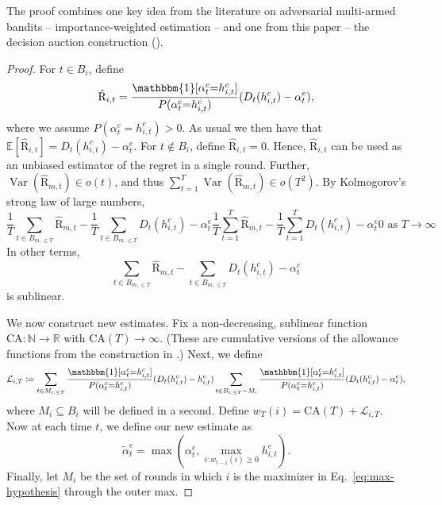 \documentclass[submission,copyright,creativecommons]{eptcs}
\DeclareMathOperator{\Var}{Var}
\begin{document}
\begin{extendedonlyblock}
The proof combines one key idea from the literature on adversarial multi-armed bandits -- importance-weighted estimation -- and one from this paper -- the decision auction construction ().

\begin{proof}
For $t\in B_i$, define
\begin{equation*}
\hat{\mathrm{R}}_{i,t} = \frac{\mathbbm{1}[\alpha_{t}^c{=}h_{i,t}^c]}{P(\alpha_{t}^c{=}h_{i,t}^c)}(D_t(h^c_{i,t}) - \alpha^e_t),
\end{equation*}
where we assume $P(\alpha_{t}^c{=}h_{i,t}^c)>0$.
As usual we then have that $\mathbb{E}\left[ \hat{\mathrm{R}}_{i,t} \right] = D_t(h^c_{i,t}) - \alpha^e_t$.
For $t\notin B_i$, define $\hat{\mathrm{R}}_{i,t}=0$.
Hence, $\hat{\mathrm{R}}_{i,t}$ can be used as an unbiased estimator of the regret in a single round.
Further, $\Var(\hat{\mathrm{R}}_{m,t})\in o(t)$, and thus $\sum_{t=1}^T \Var(\hat{\mathrm{R}}_{m,t}) \in o(T^2)$. By Kolmogorov's strong law of large numbers,
\begin{equation*}
%
\frac{1}{T} \sum_{t\in B_{m,\leq T}} \hat{\mathrm{R}}_{m,t} - \frac{1}{T}\sum_{t\in B_{m,\leq T}} D_t(h^c_{i,t}) - \alpha^e_t%
%
\frac{1}{T} \sum_{t=1}^T \hat{\mathrm{R}}_{m,t} - \frac{1}{T} \sum_{t=1}^T  D_t(h^c_{i,t}) - \alpha^e_t%
%
0 \text{ as  }T\rightarrow \infty
\end{equation*}
In other terms,
\begin{equation*}
 \sum_{t\in B_{m,\leq T}} \hat{\mathrm{R}}_{m,t} - \sum_{t\in B_{m,\leq T}} D_t(h^c_{i,t}) - \alpha^e_t
\end{equation*}
is sublinear.

We now construct new estimates. Fix a non-decreasing, sublinear function $\mathrm{CA}\colon \mathbb{N}\rightarrow \mathbb{R}$ with $\mathrm{CA}(T) \rightarrow \infty$. (These are cumulative versions of the allowance functions from the construction in .)
Next, we define
\begin{equation*}
\mathcal{L}_{i,T}\coloneqq %
\sum_{t\in M_{i,\leq T}} \frac{\mathbbm{1}[\alpha_{t}^c{=}h_{i,t}^c]}{P(\alpha_{t}^c{=}h_{i,t}^c)}(D_t(h^c_{i,t}) - h^e_{i,t})%
%
\sum_{t\in B_{i,\leq T}-M_i} \frac{\mathbbm{1}[\alpha_{t}^c{=}h_{i,t}^c]}{P(\alpha_{t}^c{=}h_{i,t}^c)}(D_t(h^c_{i,t}) - \alpha^e_t),
\end{equation*}
%
where $M_{i}\subseteq B_i$ will be defined in a second. Define $w_{T}(i)=\mathrm{CA}(T) + \mathcal{L}_{i,T}$.
Now at each time $t$, we define our new estimate as
\begin{equation}\label{eq:max-hypothesis}
\tilde \alpha_t^e = \max (\alpha_t^e, \max_{i:w_{t-1}(i) \geq 0} h_{i,t}^e).
\end{equation}
Finally, let $M_i$ be the set of rounds in which $i$ is the maximizer in Eq.\ \ref{eq:max-hypothesis} through the outer max.


\end{proof}
\end{extendedonlyblock}
\end{document}
